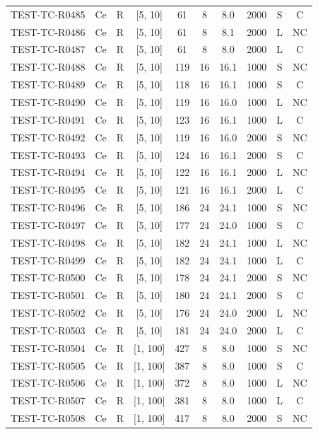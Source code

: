 \begin{longtable}{lccccccccc}
TEST-TC-R0485 & Ce & R & [5, 10] & 61 & 8 & 8.0 & 2000 & S & C \\
TEST-TC-R0486 & Ce & R & [5, 10] & 61 & 8 & 8.1 & 2000 & L & NC \\
TEST-TC-R0487 & Ce & R & [5, 10] & 61 & 8 & 8.0 & 2000 & L & C \\
TEST-TC-R0488 & Ce & R & [5, 10] & 119 & 16 & 16.1 & 1000 & S & NC \\
TEST-TC-R0489 & Ce & R & [5, 10] & 118 & 16 & 16.1 & 1000 & S & C \\
TEST-TC-R0490 & Ce & R & [5, 10] & 119 & 16 & 16.0 & 1000 & L & NC \\
TEST-TC-R0491 & Ce & R & [5, 10] & 123 & 16 & 16.1 & 1000 & L & C \\
TEST-TC-R0492 & Ce & R & [5, 10] & 119 & 16 & 16.0 & 2000 & S & NC \\
TEST-TC-R0493 & Ce & R & [5, 10] & 124 & 16 & 16.1 & 2000 & S & C \\
TEST-TC-R0494 & Ce & R & [5, 10] & 122 & 16 & 16.1 & 2000 & L & NC \\
TEST-TC-R0495 & Ce & R & [5, 10] & 121 & 16 & 16.1 & 2000 & L & C \\
TEST-TC-R0496 & Ce & R & [5, 10] & 186 & 24 & 24.1 & 1000 & S & NC \\
TEST-TC-R0497 & Ce & R & [5, 10] & 177 & 24 & 24.0 & 1000 & S & C \\
TEST-TC-R0498 & Ce & R & [5, 10] & 182 & 24 & 24.1 & 1000 & L & NC \\
TEST-TC-R0499 & Ce & R & [5, 10] & 182 & 24 & 24.1 & 1000 & L & C \\
TEST-TC-R0500 & Ce & R & [5, 10] & 178 & 24 & 24.1 & 2000 & S & NC \\
TEST-TC-R0501 & Ce & R & [5, 10] & 180 & 24 & 24.1 & 2000 & S & C \\
TEST-TC-R0502 & Ce & R & [5, 10] & 176 & 24 & 24.0 & 2000 & L & NC \\
TEST-TC-R0503 & Ce & R & [5, 10] & 181 & 24 & 24.0 & 2000 & L & C \\
TEST-TC-R0504 & Ce & R & [1, 100] & 427 & 8 & 8.0 & 1000 & S & NC \\
TEST-TC-R0505 & Ce & R & [1, 100] & 387 & 8 & 8.0 & 1000 & S & C \\
TEST-TC-R0506 & Ce & R & [1, 100] & 372 & 8 & 8.0 & 1000 & L & NC \\
TEST-TC-R0507 & Ce & R & [1, 100] & 381 & 8 & 8.0 & 1000 & L & C \\
TEST-TC-R0508 & Ce & R & [1, 100] & 417 & 8 & 8.0 & 2000 & S & NC \\

\end{longtable}
